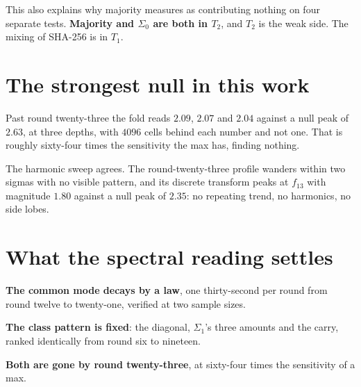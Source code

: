 This also explains why majority measures as contributing nothing on four separate tests. \textbf{Majority and \(\Sigma_0\) are both in \(T_2\)}, and \(T_2\) is the weak side. The mixing of SHA-256 is in \(T_1\).

\section{The strongest null in this work}

Past round twenty-three the fold reads \(2.09\), \(2.07\) and \(2.04\) against a null peak of \(2.63\), at three depths, with \(4096\) cells behind each number and not one. That is roughly sixty-four times the sensitivity the max has, finding nothing.

The harmonic sweep agrees. The round-twenty-three profile wanders within two sigmas with no visible pattern, and its discrete transform peaks at \(f_{13}\) with magnitude \(1.80\) against a null peak of \(2.35\): no repeating trend, no harmonics, no side lobes.

\section{What the spectral reading settles}

\textbf{The common mode decays by a law}, one thirty-second per round from round twelve to twenty-one, verified at two sample sizes.

\textbf{The class pattern is fixed}: the diagonal, \(\Sigma_1\)'s three amounts and the carry, ranked identically from round six to nineteen.

\textbf{Both are gone by round twenty-three}, at sixty-four times the sensitivity of a max.
